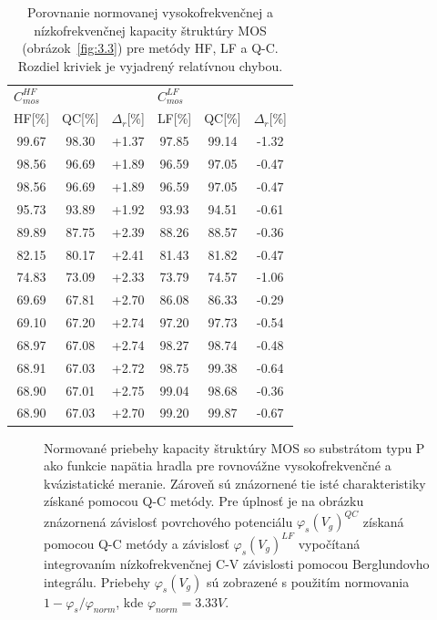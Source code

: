 \begin{table}[h!]\centering
  \begin{tabular}{c c c c c c}
    \multicolumn{3}{l}{$C^{HF}_{mos}$} & \multicolumn{3}{l}{$C^{LF}_{mos}$} \\
    HF[\%] & QC[\%] & $\Delta_r$[\%] & LF[\%] & QC[\%] & $\Delta_r$[\%] \\
    \hline%
    99.67 & 98.30 & +1.37 & 97.85 & 99.14 & -1.32 \\
    98.56 & 96.69 & +1.89 & 96.59 & 97.05 & -0.47 \\
    98.56 & 96.69 & +1.89 & 96.59 & 97.05 & -0.47 \\
    95.73 & 93.89 & +1.92 & 93.93 & 94.51 & -0.61 \\
    89.89 & 87.75 & +2.39 & 88.26 & 88.57 & -0.36 \\
    82.15 & 80.17 & +2.41 & 81.43 & 81.82 & -0.47 \\
    74.83 & 73.09 & +2.33 & 73.79 & 74.57 & -1.06 \\
    69.69 & 67.81 & +2.70 & 86.08 & 86.33 & -0.29 \\
    69.10 & 67.20 & +2.74 & 97.20 & 97.73 & -0.54 \\
    68.97 & 67.08 & +2.74 & 98.27 & 98.74 & -0.48 \\
    68.91 & 67.03 & +2.72 & 98.75 & 99.38 & -0.64 \\
    68.90 & 67.01 & +2.75 & 99.04 & 98.68 & -0.36 \\
    68.90 & 67.03 & +2.70 & 99.20 & 99.87 & -0.67 \\
  \end{tabular}
  \caption[Porovnanie normovanej vysokofrekvenčnej a nízkofrekvenčnej
    kapacity štruktúry MOS (obrázok~\ref{fig:3.3}) pre metódy HF, LF a
    Q-C]{Porovnanie normovanej vysokofrekvenčnej a nízkofrekvenčnej
    kapacity štruktúry MOS (obrázok~\ref{fig:3.3}) pre metódy HF, LF a
    Q-C. Rozdiel kriviek je vyjadrený relatívnou chybou.}\label{tab:3.1}
\end{table}

\newpage
\begin{figure}[h!]\centering
  
  \caption[Normované priebehy kapacity štruktúry MOS so substrátom
    typu P ako funkcie napätia hradla pre rovnovážne vysokofrekvenčné
    a kvázistatické meranie]{Normované priebehy kapacity štruktúry MOS
    so substrátom typu P ako funkcie napätia hradla pre rovnovážne
    vysokofrekvenčné a kvázistatické meranie.  Zároveň sú znázornené
    tie isté charakteristiky získané pomocou Q-C metódy. Pre úplnosť
    je na obrázku znázornená závislosť povrchového potenciálu
    ${\varphi_s(V_g)}^{QC}$ získaná pomocou Q-C metódy a závislosť
    ${\varphi_s(V_g)}^{LF}$ vypočítaná integrovaním nízkofrekvenčnej
    C-V závislosti pomocou Berglundovho integrálu.  Priebehy
    $\varphi_s(V_g)$ sú zobrazené s použitím normovania $1 -
    {\varphi_s}/{\varphi_{norm}}$, kde
    $\varphi_{norm}=3.33V$.}\label{fig:3.4}
\end{figure}

